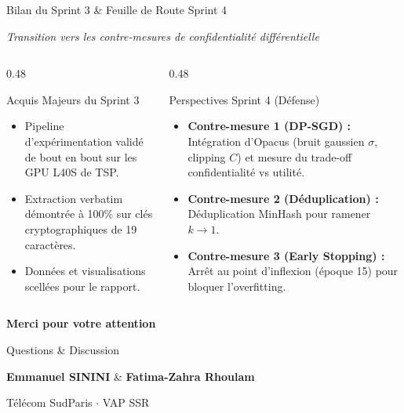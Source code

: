\documentclass[aspectratio=169, 10pt, table]{beamer}
\newcommand{\subtitleline}[1]{{\small\itshape\color{TSPcyan}#1\par}\vspace{0.15cm}}
\begin{document}
\begin{frame}{Bilan du Sprint 3 \& Feuille de Route Sprint 4}
    \subtitleline{Transition vers les contre-mesures de confidentialité différentielle}
    \begin{columns}[T]
        \begin{column}{0.48\textwidth}
            \begin{block}{Acquis Majeurs du Sprint 3}
                \begin{itemize}
                    \item Pipeline d'expérimentation validé de bout en bout sur les GPU L40S de TSP.
                    \item Extraction verbatim démontrée à 100\% sur clés cryptographiques de 19 caractères.
                    \item Données et visualisations scellées pour le rapport.
                \end{itemize}
            \end{block}
        \end{column}
        \begin{column}{0.48\textwidth}
            \begin{alertblock}{Perspectives Sprint 4 (Défense)}
                \begin{itemize}
                    \item \textbf{Contre-mesure 1 (DP-SGD) :} Intégration d'Opacus (bruit gaussien $\sigma$, clipping $C$) et mesure du trade-off confidentialité vs utilité.
                    \item \textbf{Contre-mesure 2 (Déduplication) :} Déduplication MinHash pour ramener $k \to 1$.
                    \item \textbf{Contre-mesure 3 (Early Stopping) :} Arrêt au point d'inflexion (époque 15) pour bloquer l'overfitting.
                \end{itemize}
            \end{alertblock}
        \end{column}
    \end{columns}
\end{frame}

\begin{frame}[plain]
    \centering
    \vfill
    {\huge\textbf{Merci pour votre attention}}\par
    \vspace{0.8cm}
    {\Large Questions \& Discussion\par}
    \vspace{0.8cm}
    {\small \textbf{Emmanuel SININI} \& \textbf{Fatima-Zahra Rhoulam}\par
    Télécom SudParis $\cdot$ VAP SSR\par}
    \vfill
\end{frame}
\end{document}
